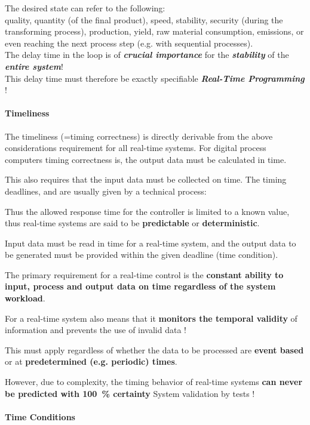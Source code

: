The desired state can refer to the following:\\

quality, quantity (of the final product), speed, stability, security (during the transforming process), production, yield, raw material consumption, emissions, or even reaching the next process step (e.g. with sequential processes).\\

The delay time in the loop is of \textbf{\textit{crucial importance}} for the \textbf{\textit{stability}} of the \textbf{\textit{entire system}}!\\
This delay time must therefore be exactly specifiable  \textbf{\textit{Real-Time Programming}} !

\paragraph{  Timeliness}

The timeliness (=timing correctness) is directly derivable from the above considerations requirement for all real-time systems. For digital process computers timing correctness is, the output data must be calculated in time.

This also requires that the input data must be collected on time. The timing deadlines, and are usually given by a technical process:

Thus the allowed response time for the controller is limited to a known value, thus real-time systems are said to be \textbf{predictable} or \textbf{deterministic}.

Input data must be read in time for a real-time system, and the output data to be generated must be provided within the given deadline (time condition). 

The primary requirement for a real-time control is the \textbf{constant ability to input, process and output data on time regardless of the system workload}. 

For a real-time system also means that it \textbf{monitors the temporal validity} of information and prevents the use of invalid data !

This must apply regardless of whether the data to be processed are \textbf{event based} or at \textbf{predetermined (e.g. periodic) times}.

However, due to complexity, the timing behavior of real-time systems \textbf{can never be predicted with 100~\% certainty}  System validation by tests !

\paragraph{  Time Conditions}

